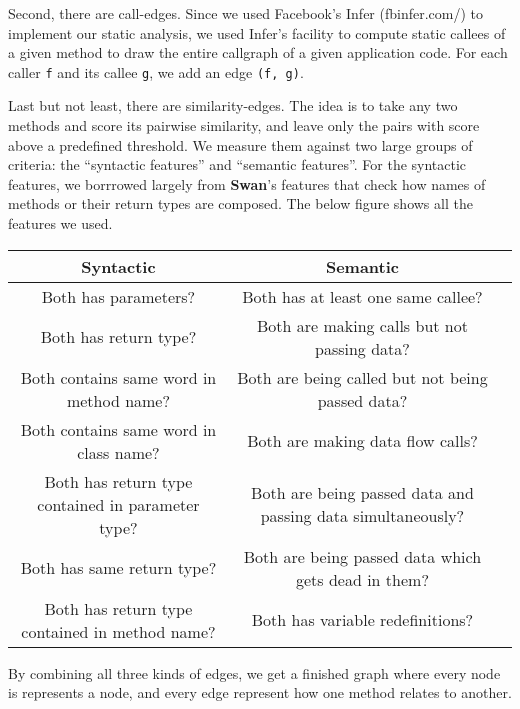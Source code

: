 

Second, there are call-edges. Since we used Facebook's Infer (fbinfer.com/) to
implement our static analysis, we used Infer's facility to compute static
callees of a given method to draw the entire callgraph of a given application
code. For each caller \texttt{f} and its callee \texttt{g}, we add an edge
\texttt{(f, g)}.


Last but not least, there are similarity-edges. The idea is to take any two
methods and score its pairwise similarity, and leave only the pairs with score
above a predefined threshold. We measure them against two large groups of
criteria: the ``syntactic features'' and ``semantic features''. For the
syntactic features, we borrrowed largely from \textbf{Swan}'s features that
check how names of methods or their return types are composed. The below
figure %
shows all the features we used.

\begin{center}
  \begin{tabular} { |c|c|c| }
    \hline
    Syntactic & Semantic\\
    \hline
    \hline
    Both has parameters? & Both has at least one same callee?\\
    Both has return type? & Both are making calls but not passing data?\\
    Both contains same word in method name? & Both are being called but not being passed data?\\
    Both contains same word in class name? & Both are making data flow calls?\\
    Both has return type contained in parameter type? & Both are being passed data and passing data simultaneously?\\
    Both has same return type? & Both are being passed data which gets dead in them?\\
    Both has return type contained in method name? & Both has variable redefinitions?\\
    \hline
  \end{tabular}
\end{center} 

By combining all three kinds of edges, we get a finished graph where every node
is represents a node, and every edge represent how one method relates to another.

